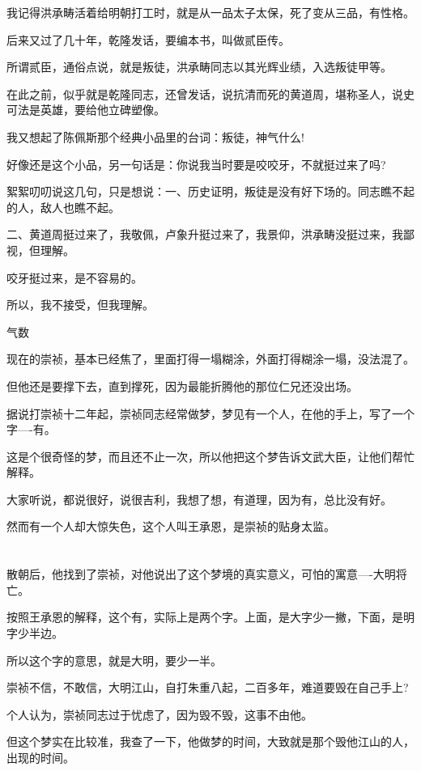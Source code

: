 \documentclass[11pt,a4paper,onecolumn]{article}
\begin{document}
我记得洪承畴活着给明朝打工时，就是从一品太子太保，死了变从三品，有性格。

后来又过了几十年，乾隆发话，要编本书，叫做贰臣传。

所谓贰臣，通俗点说，就是叛徒，洪承畴同志以其光辉业绩，入选叛徒甲等。

在此之前，似乎就是乾隆同志，还曾发话，说抗清而死的黄道周，堪称圣人，说史可法是英雄，要给他立碑塑像。

我又想起了陈佩斯那个经典小品里的台词：叛徒，神气什么!

好像还是这个小品，另一句话是：你说我当时要是咬咬牙，不就挺过来了吗?

絮絮叨叨说这几句，只是想说：一、历史证明，叛徒是没有好下场的。同志瞧不起的人，敌人也瞧不起。

二、黄道周挺过来了，我敬佩，卢象升挺过来了，我景仰，洪承畴没挺过来，我鄙视，但理解。

咬牙挺过来，是不容易的。

所以，我不接受，但我理解。

气数

现在的崇祯，基本已经焦了，里面打得一塌糊涂，外面打得糊涂一塌，没法混了。

但他还是要撑下去，直到撑死，因为最能折腾他的那位仁兄还没出场。

据说打崇祯十二年起，崇祯同志经常做梦，梦见有一个人，在他的手上，写了一个字----有。

这是个很奇怪的梦，而且还不止一次，所以他把这个梦告诉文武大臣，让他们帮忙解释。

大家听说，都说很好，说很吉利，我想了想，有道理，因为有，总比没有好。

然而有一个人却大惊失色，这个人叫王承恩，是崇祯的贴身太监。

\section[\thesection]{}

散朝后，他找到了崇祯，对他说出了这个梦境的真实意义，可怕的寓意----大明将亡。

按照王承恩的解释，这个有，实际上是两个字。上面，是大字少一撇，下面，是明字少半边。

所以这个字的意思，就是大明，要少一半。

崇祯不信，不敢信，大明江山，自打朱重八起，二百多年，难道要毁在自己手上?

个人认为，崇祯同志过于忧虑了，因为毁不毁，这事不由他。

但这个梦实在比较准，我查了一下，他做梦的时间，大致就是那个毁他江山的人，出现的时间。
\end{document}
